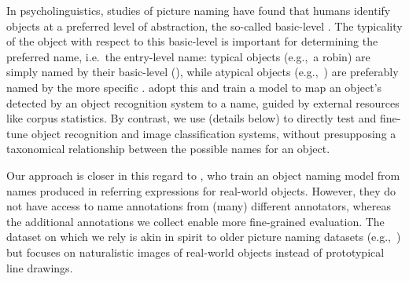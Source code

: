 %
In psycholinguistics, studies of picture naming have found that humans identify objects at a preferred level of abstraction, the so-called basic-level \cite{rosch1976basic,jolicoeur1984pictures}. 
The typicality of the object with respect to this basic-level is important for determining the preferred name, i.e.\ the entry-level name: typical objects (e.g.,\ a robin) are simply named by their basic-level \category (), while atypical objects (e.g.,\ ) are preferably named by the more specific \category.
\citet{Ordonez:2016} adopt this and train a model to map an object's \category detected by an object recognition system to a name, guided by external resources like corpus statistics.
By contrast, we use \mn (details below) to directly test and fine-tune object recognition and image classification systems, without presupposing a taxonomical relationship between the possible names for an object.

Our approach is closer in this regard to \citet{zarriess-schlangen:2017}, who train an object naming model from names produced in referring expressions for real-world objects.
However, they do not have access to name annotations from (many) different annotators, whereas the additional annotations we collect enable more fine-grained evaluation.
The \mn dataset on which we rely is akin in spirit to older picture naming datasets (e.g.,~\citealt{rossion2004revisiting}) but focuses on naturalistic images of real-world objects instead of prototypical line drawings.

